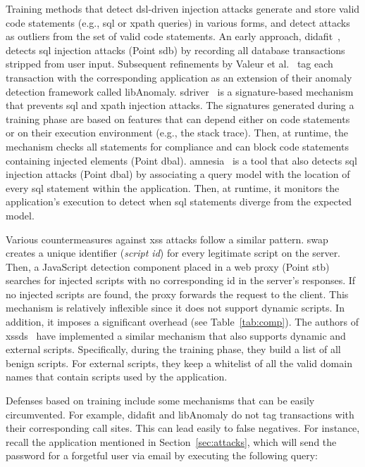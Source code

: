 \documentclass[conference]{IEEEtran}
\begin{document}
Training methods that detect {\sc dsl}-driven injection attacks
generate and store valid code statements (e.g., {\sc sql} or {\sc
  xp}ath queries) in various forms, and detect attacks as outliers
from the set of valid code statements. An early approach,
{\sc didafit}~\cite{LLW02}, detects {\sc sql} injection attacks (Point
{\sc sdb}) by recording all database transactions
stripped from user input. Subsequent
refinements by Valeur et al.~\cite{VMV05} tag each transaction with
the corresponding application as an extension of their anomaly
detection framework called libAnomaly.
{\sc sd}river~\cite{MS09,MKS09,MKLS11} is a signature-based mechanism
that prevents {\sc sql} and {\sc xp}ath injection attacks. The
signatures generated during a training phase are based on features
that can depend either on code statements or on their execution
environment (e.g., the stack trace). Then, at runtime, the mechanism
checks all statements for compliance and can block code statements
containing injected elements (Point {\sc dbal}). {\sc
  amnesia}~\cite{HO05,HO06,HO05b} is a tool that also detects {\sc
  sql} injection attacks (Point {\sc dbal}) by associating a query model
with the location of every {\sc sql} statement within the application.
Then, at runtime, it monitors the application's execution to detect
when {\sc sql} statements diverge from the expected model.

Various countermeasures against {\sc xss} attacks follow a similar
pattern. {\sc swap}~\cite{WPLKK09} creates a unique identifier
({\it script {\sc id}}) for every legitimate script on the server.
Then, a JavaScript detection component placed in a web proxy (Point
{\sc s}t{\sc b}) searches for injected scripts with no corresponding {\sc id}
in the server's responses. If no injected scripts are found, the proxy
forwards the request to the client. This mechanism is relatively
inflexible since it does not support dynamic scripts. In addition, it
imposes a significant overhead (see Table~\ref{tab:comp}). The authors
of {\sc xssds}~\cite{JEP08} have implemented a similar mechanism
that also supports dynamic and external scripts. Specifically, during the
training phase, they build a list of all benign scripts. For
external scripts, they keep a whitelist of all the valid domain names
that contain scripts used by the application.

Defenses based on training include some mechanisms that can be easily
circumvented. For example, {\sc didafit} and libAnomaly do not
tag transactions with their corresponding call sites. This can lead
easily to false negatives. For instance, recall the application
mentioned in Section~\ref{sec:attacks}, which will send the password
for a forgetful user via email by executing the following query:
\end{document}
